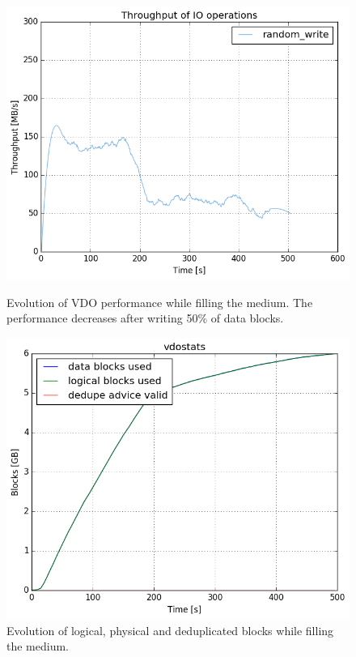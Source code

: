 \documentclass[
  color, %
  table, %
  lof,   %
  lot,   %
]{fithesis3}
\begin{document}
\begin{figure}[!htb]
        \centering
        \includegraphics[width=\textwidth]{../results/steady/korben/nice/report/tar_829_bw.png}
\caption[Evolution of VDO performance while filling the medium]{Evolution of VDO performance while filling the medium. The performance decreases after writing 50\% of data blocks.}
\label{fig:half-evol}
        \centering
        \includegraphics[width=\textwidth]{../results/steady/korben/nice/report/tar_829_vdostats.png}
\caption[[Evolution of VDO block utilization while filling the medium]{Evolution of logical, physical and deduplicated blocks while filling the medium.}
\label{fig:half-evol-vdostats}
\end{figure}
\end{document}
